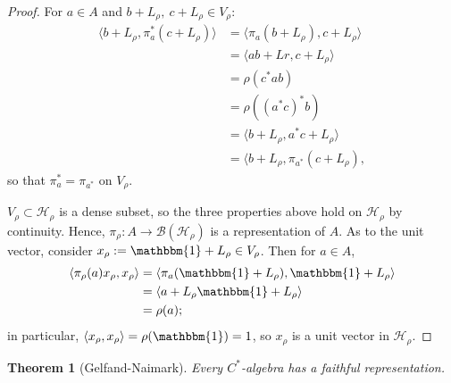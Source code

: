 \documentclass[12pt,a4paper]{amsart}
\theoremstyle{plain}
\newtheorem{thm}{Theorem}
\theoremstyle{definition}
\newcommand{\B}{\mathcal{B}}
\newcommand{\Hr}{\mathcal{H}_\rho}
\newcommand{\1}{\mathbbm{1}}
\newcommand{\Vr}{V_\rho}
\newcommand{\Lr}{L_\rho}
\newcommand{\xr}{x_\rho}
\begin{document}
\begin{proof}
	
	For $a\in A$ and $b+ L_\rho,~c+ L_\rho \in \Vr$:
	\begin{align*}
				\langle b+\Lr, \pi_a^\ast (c+\Lr) \rangle 
		&=		\langle \pi_a (b+\Lr), c+\Lr \rangle						\\
		&=		\langle ab +Lr, c+\Lr \rangle								\\
		&=		\rho(c^\ast ab)												\\
		&=		\rho((a^\ast c)^\ast b)										\\
		&=		\langle b+\Lr, a^\ast c+\Lr \rangle							\\
		&=		\langle b+\Lr, \pi_{a^\ast}(c+\Lr),
	\end{align*}
	so that $ \pi_a^\ast = \pi_{a^\ast}$ on $\Vr$.
	
	$\Vr \subset \Hr$ is a dense subset, so the three properties above hold on 
	$\Hr$ by continuity.  %
	Hence, $\pi_\rho: A \to \B(\Hr)$ is a representation of $A$.
	As to the unit vector, consider $\xr := \1 + \Lr \in \Vr$. Then for $a \in A$,
	\begin{align*}
				\langle \pi_\rho(a)\xr ,\xr \rangle 
		&=		\langle \pi_a(\1+\Lr), \1+\Lr \rangle						\\
		&=		\langle a+\Lr \1+\Lr \rangle								\\
		&=		\rho(a);
	\end{align*}
	in particular, $\langle \xr,\xr \rangle = \rho (\1) = 1$, so $\xr$ is a unit vector in $\Hr$.	
\end{proof}


\begin{thm}[Gelfand-Naimark]
	Every $C^\ast$-algebra has a faithful representation.
\end{thm}

\end{document}
